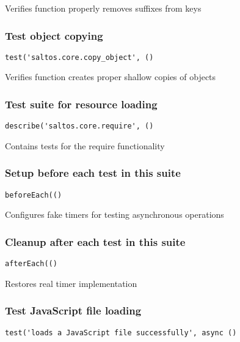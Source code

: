 \documentclass[a4paper]{article}
\begin{document}
Verifies function properly removes suffixes from keys

\hypertarget{toc520}{}
\subsubsection{Test object copying}

\begin{lstlisting}
test('saltos.core.copy_object', ()
\end{lstlisting}

Verifies function creates proper shallow copies of objects

\hypertarget{toc521}{}
\subsubsection{Test suite for resource loading}

\begin{lstlisting}
describe('saltos.core.require', ()
\end{lstlisting}

Contains tests for the require functionality

\hypertarget{toc522}{}
\subsubsection{Setup before each test in this suite}

\begin{lstlisting}
beforeEach(()
\end{lstlisting}

Configures fake timers for testing asynchronous operations

\hypertarget{toc523}{}
\subsubsection{Cleanup after each test in this suite}

\begin{lstlisting}
afterEach(()
\end{lstlisting}

Restores real timer implementation

\hypertarget{toc524}{}
\subsubsection{Test JavaScript file loading}

\begin{lstlisting}
test('loads a JavaScript file successfully', async ()
\end{lstlisting}
\end{document}
